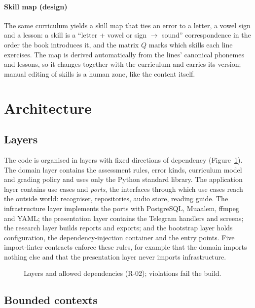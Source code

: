 \paragraph{Skill map (design)} The same curriculum yields a skill map that ties an error to a letter, a vowel sign and a lesson: a skill is a ``letter + vowel or sign $\to$ sound'' correspondence in the order the
book introduces it, and the matrix $Q$ marks which skills each line exercises. The map is derived automatically
from the lines' canonical phonemes and lessons, so it changes together with the curriculum and carries its
version; manual editing of skills is a human zone, like the content itself.

\section{Architecture}\label{sec:impl-architecture}

\subsection{Layers}

The code is organised in layers with fixed directions of dependency (Figure~\ref{fig:layers}). The domain
layer contains the assessment rules, error kinds, curriculum model and grading policy and uses only the
Python standard library. The application layer contains use cases and \emph{ports}, the interfaces through
which use cases reach the outside world: recogniser, repositories, audio store, reading guide. The
infrastructure layer implements the ports with PostgreSQL, Muaalem, ffmpeg and YAML; the presentation layer
contains the Telegram handlers and screens; the research layer builds reports and exports; and the bootstrap
layer holds configuration, the dependency-injection container and the entry points. Five import-linter
contracts enforce these rules, for example that the domain imports nothing else and that the presentation
layer never imports infrastructure.

\begin{figure}[ht]
\centering
\resizebox{0.9\linewidth}{!}{}
\caption{Layers and allowed dependencies (R-02); violations fail the build.}\label{fig:layers}
\end{figure}

\subsection{Bounded contexts}

